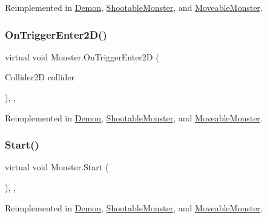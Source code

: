 Reimplemented in \mbox{\hyperlink{class_demon_a1a87c40897c33f1a752e66807fb53f34}{Demon}}, \mbox{\hyperlink{class_shootable_monster_adfb9638b7a397563df4ab94c2db20ec0}{Shootable\+Monster}}, and \mbox{\hyperlink{class_moveable_monster_ae4e3c98d944fa303cf1b2c7f4a05a342}{Moveable\+Monster}}.

\mbox{\label{class_monster_af6ac6a4c01088e6b4abf79da772cecff}} 
\subsubsection{\texorpdfstring{On\+Trigger\+Enter2\+D()}{OnTriggerEnter2D()}}
{\footnotesize\ttfamily virtual void Monster.\+On\+Trigger\+Enter2D (\begin{DoxyParamCaption}\item[{Collider2D}]{collider }\end{DoxyParamCaption})\hspace{0.3cm}{\ttfamily [inline]}, {\ttfamily [protected]}, {\ttfamily [virtual]}}



Reimplemented in \mbox{\hyperlink{class_demon_aa0c85beffd46a97daa76e65bb2388444}{Demon}}, \mbox{\hyperlink{class_shootable_monster_a6c350a976d1bb37db2c663834c90e83b}{Shootable\+Monster}}, and \mbox{\hyperlink{class_moveable_monster_a07aefb0242f24f5b0f2b4cd820b31522}{Moveable\+Monster}}.

\mbox{\label{class_monster_a79f369a560bdcf5b3dfaf8c9382582d8}} 
\subsubsection{\texorpdfstring{Start()}{Start()}}
{\footnotesize\ttfamily virtual void Monster.\+Start (\begin{DoxyParamCaption}{ }\end{DoxyParamCaption})\hspace{0.3cm}{\ttfamily [inline]}, {\ttfamily [protected]}, {\ttfamily [virtual]}}



Reimplemented in \mbox{\hyperlink{class_demon_ae40d3b2d791569cd6517117aa19335b3}{Demon}}, \mbox{\hyperlink{class_shootable_monster_a0e26de95298ec75a591ecede3c1d8cb9}{Shootable\+Monster}}, and \mbox{\hyperlink{class_moveable_monster_a898a6098d4dd0226084e36f3a1c7f093}{Moveable\+Monster}}.

